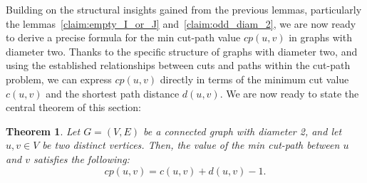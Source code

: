 \documentclass[journal ]{new-aiaa}
\numberwithin{equation}{section}
\theoremstyle{definition}
\theoremstyle{plain}
\newtheorem{theorem}[definition]{Theorem}
\theoremstyle{remark}
\begin{document}
Building on the structural insights gained from the previous lemmas, particularly the lemmas~\ref{claim:empty_I_or_J} and~\ref{claim:odd_diam_2}, we are now ready to derive a precise formula for the min cut-path value $cp(u,v)$ in graphs with diameter two. Thanks to the specific structure of graphs with diameter two, and using the established relationships between cuts and paths within the cut-path problem, we can express $cp(u,v)$ directly in terms of the minimum cut value $c(u,v)$ and the shortest path distance $d(u,v)$. We are now ready to state the central theorem of this section:

\begin{theorem}
\label{theorem:min_cut_path_diameter_2}
Let \(G = (V, E)\) be a connected graph with diameter 2, and let \(u, v \in V\) be two distinct vertices. Then, the value of the min cut-path between \(u\) and \(v\) satisfies the following:
\[
cp(u, v) = c(u, v) + d(u, v) - 1.
\]
\end{theorem}
\end{document}
